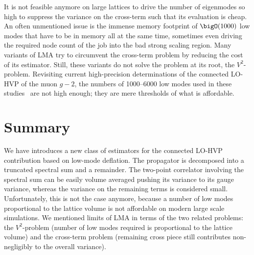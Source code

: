 It is not feasible anymore on large lattices to drive the number of eigenmodes so high to suppress the variance on the cross-term such that its evaluation is cheap.
An often unmentioned issue is the immense memory footprint of $\bigO(1000)$ low modes that have to be in memory all at the same time, sometimes even driving the required node count of the job into the bad strong scaling region.
Many variants of LMA try to circumvent the cross-term problem by reducing the cost of its estimator.
Still, these variants do not solve the problem at its root, the $V^2$-problem.
Revisiting current high-precision determinations of the connected LO-HVP of the muon $g-2$, the numbers of \numrange{1000}{6000} low modes used in these studies~\cite{Djukanovic:2024cmq,RBC_2024,bmw_2024,Aubin:2022hgm} are not high enough; they are mere thresholds of what is affordable.

\section{Summary}
\label{sec:lma:summary}


We have introduces a new class of estimators for the connected LO-HVP contribution based on low-mode deflation.
The propagator is decomposed into a truncated spectral sum and a remainder.
The two-point correlator involving the spectral sum can be easily volume averaged pushing its variance to its gauge variance, whereas the variance on the remaining terms is considered small.
Unfortunately, this is not the case anymore, because a number of low modes proportional to the lattice volume is not affordable on modern large scale simulations.
We mentioned limits of LMA in terms of the two related problems: the $V^2$-problem (number of low modes required is proportional to the lattice volume) and the cross-term problem (remaining cross piece still contributes non-negligibly to the overall variance).

